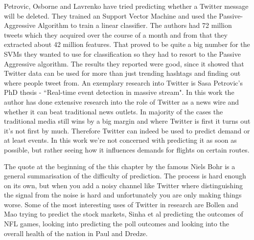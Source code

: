 \documentclass[minf,twoside,singlespacing,parskip,frontabs,notimes,12pt]{infthesis} %
\begin{document}
Petrovic, Osborne and Lavrenko\cite{Miles2} have tried predicting whether a Twitter message will be deleted. 
They trained an Support Vector Machine and used the Passive-Aggressive Algorithm to train a linear classifier. 
The authors had 72 million tweets which they acquired over the course of a month and from that they extracted about 42 million features. That proved to be quite a big number for the SVMs they wanted to use for classification so they had to resort to the Passive Aggressive algorithm. The results they reported were good, since it showed that Twitter data can be used for more than just trending hashtags and finding out where people tweet from. 
An exemplary research into Twitter is Sasa Petrovic's PhD thesis - ``Real-time event detection in massive stream"\cite{Petrovic2012}. 
In this work the author has done extensive research into the role of Twitter as a news wire and whether it can beat traditional news outlets. 
In majority of the cases the traditional media still wins by a big margin and where Twitter is first it turns out it's not first by much. 
 Therefore Twitter can indeed be used to predict demand or at least events. 
 In this work we're not concerned with predicting it as soon as possible, but rather seeing how it influences demands for flights on certain routes.

The quote at the beginning of the this chapter by the famous Niels Bohr is a general summarisation of the difficulty of prediction. The process is hard enough on its own, but when you add a noisy channel like Twitter where distinguishing the signal from the noise is hard and unfortunately you are only making things worse. Some of the most interesting uses of Twitter in research are Bollen and Mao trying to predict the stock markets\cite{twitstock}, Sinha et al predicting the outcomes of NFL games\cite{twitnfl}, looking into predicting the poll outcomes\cite{twitpoll} and looking into the overall health of the nation in Paul and Dredze\cite{twitflu}.
\end{document}
